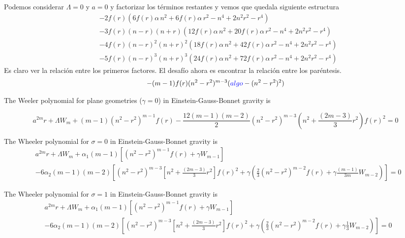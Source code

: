 Podemos considerar $\Lambda=0$ y $a=0$ y factorizar los términos restantes y vemos que quedala siguiente estructura
\begin{align*}
   & -2 f \! \left(r \right) \left(6 f \! \left(r \right) \alpha  \,n^{2}+6 f \! \left(r \right) \alpha  \,r^{2}-n^{4}+2 n^{2} r^{2}-r^{4}\right)\\
   &-3 f \! \left(r \right) \left(n -r \right) \left(n +r \right) \left(12 f \! \left(r \right) \alpha  \,n^{2}+20 f \! \left(r \right) \alpha  \,r^{2}-n^{4}+2 n^{2} r^{2}-r^{4}\right)\\
   &-4 f \! \left(r \right) \left(n -r \right)^{2} \left(n +r \right)^{2} \left(18 f \! \left(r \right) \alpha  \,n^{2}+42 f \! \left(r \right) \alpha  \,r^{2}-n^{4}+2 n^{2} r^{2}-r^{4}\right)\\
   &-5 f \! \left(r \right) \left(n -r \right)^{3} \left(n +r \right)^{3} \left(24 f \! \left(r \right) \alpha  \,n^{2}+72 f \! \left(r \right) \alpha  \,r^{2}-n^{4}+2 n^{2} r^{2}-r^{4}\right)
\end{align*}
Es claro ver la relación entre los primeros factores. El desafío ahora es encontrar la relación entre los paréntesis.
\begin{equation*}
    -(m-1)f(r)(n^2-r^2)^{m-3}(\textcolor{blue}{algo}-(n^2-r^2)^2)
\end{equation*}

The Weeler polynomial for plane geometries ($\gamma=0$) in Einstein-Gauss-Bonnet gravity is

\begin{equation*}
   a^{2m}r+\Lambda W_m +(m-1)(n^2-r^2)^{m-1}f(r)-\frac{12(m-1)(m-2)}{2}(n^2-r^2)^{m-3}\left(n^2+\frac{(2m-3)}{3}r^2\right)f(r)^2=0
\end{equation*}

The Wheeler polynomial for $\sigma=0$ in Einstein-Gauss-Bonnet gravity is
\begin{align*}
    &a^{2m}r+\Lambda W_m +\alpha_1(m-1)\left[(n^2-r^2)^{m-1}f(r)+\gamma W_{m-1}\right]\\&-6\alpha_2(m-1)(m-2)\left[(n^2-r^2)^{m-3}\left[n^2+\frac{(2m-3)}{3}r^2\right]f(r)^2+\gamma\left(\frac{2}{3}(n^2-r^2)^{m-2}f(r)+\gamma\frac{(m-1)}{3m}W_{m-2}\right)\right]=0
\end{align*}

The Wheeler polynomial for $\sigma=1$ in Einstein-Gauss-Bonnet gravity is
\begin{align*}
    &a^{2m}r+\Lambda W_m +\alpha_1(m-1)\left[(n^2-r^2)^{m-1}f(r)+\gamma W_{m-1}\right]
    \\&-6\alpha_2(m-1)(m-2)\left[(n^2-r^2)^{m-3}\left[n^2+\frac{(2m-3)}{3}r^2\right]f(r)^2+\gamma\left(\frac{2}{3}(n^2-r^2)^{m-2}f(r)+\gamma\frac{1}{3}W_{m-2}\right)\right]=0
\end{align*}

